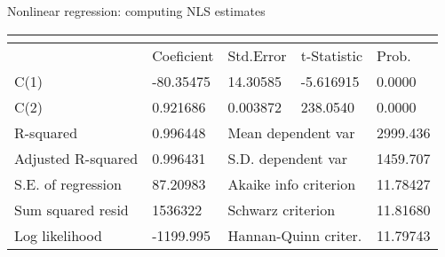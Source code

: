 \documentclass{beamer}
\begin{document}
\begin{frame}{Nonlinear regression: computing NLS estimates}
\begin{table}[]
\begin{tabular}{@{}lllll@{}}
\multicolumn{5}{l}{}                                                                                                                                                                                                                                                       \\ \midrule
                                                           & Coeficient                                         & Std.Error                                         & t-Statistic                                        & Prob.                                           \\
\midrule
C(1)                                                       & -80.35475                                          & 14.30585                                          & -5.616915                                          & 0.0000                                          \\
C(2)                                                       & 0.921686                                           & 0.003872                                          & 238.0540                                           & 0.0000 
\\ \midrule
R-squared                                                  & 0.996448                                           & \multicolumn{2}{l}{Mean dependent var}                                                                 & 2999.436                                        \\
Adjusted R-squared                                         & 0.996431                                           & \multicolumn{2}{l}{S.D. dependent var}                                                                 & 1459.707                                        \\
S.E. of regression                                         & 87.20983                                           & \multicolumn{2}{l}{Akaike info criterion}                                                              & 11.78427                                        \\
Sum squared resid                                          & 1536322                                            & \multicolumn{2}{l}{Schwarz criterion}                                                                  & 11.81680                                        \\
Log likelihood                                             & -1199.995                                          & \multicolumn{2}{l}{Hannan-Quinn criter.}                                                               & 11.79743                                        \\

\end{tabular}
\end{table}
\end{frame}
\end{document}
